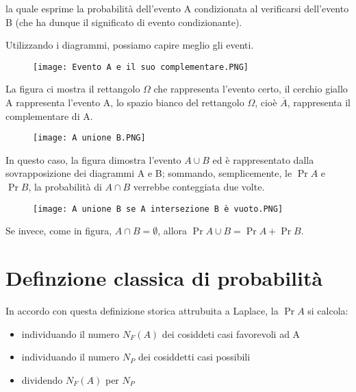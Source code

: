 la quale esprime la probabilità dell'evento A condizionata al verificarsi dell'evento B (che ha dunque il significato di evento condizionante). \newline 

Utilizzando i diagrammi, possiamo capire meglio gli eventi. \newline 

\begin{figure}[h]
    \centering
    \texttt{[image: Evento A e il suo complementare.PNG]}
\end{figure} 

\newpage

La figura ci mostra il rettangolo $\Omega$ che rappresenta l'evento certo, 
il cerchio giallo A rappresenta l'evento A, lo spazio bianco del rettangolo $\Omega$, cioè $\overline{A}$, rappresenta il complementare di A. \newline 

\begin{figure}[h]
    \centering
    \texttt{[image: A unione B.PNG]}
\end{figure} 

In questo caso, la figura dimostra l'evento $A \cup B$ ed è rappresentato dalla sovrapposizione dei diagrammi A e B; 
sommando, semplicemente, le $\Pr{A}$ e $\Pr{B}$, la probabilità di $A \cap B$ verrebbe conteggiata due volte. \newline 

\begin{figure}[h]
    \centering
    \texttt{[image: A unione B se A intersezione B è vuoto.PNG]}
\end{figure} 

Se invece, come in figura, $A\cap B = \emptyset$, allora $\Pr{A \cup B} = \Pr{A} + \Pr{B}$. \newline 

\newpage 

\section{Definzione classica di probabilità}

In accordo con questa definizione storica attrubuita a Laplace, 
la $\Pr{A}$ si calcola: 

\begin{itemize}
    \item individuando il numero $N_F (A)$ dei cosiddeti casi favorevoli ad A 
    \item individuando il numero $N_P$ dei cosiddetti casi possibili 
    \item dividendo $N_F (A)$ per $N_P$
\end{itemize}


